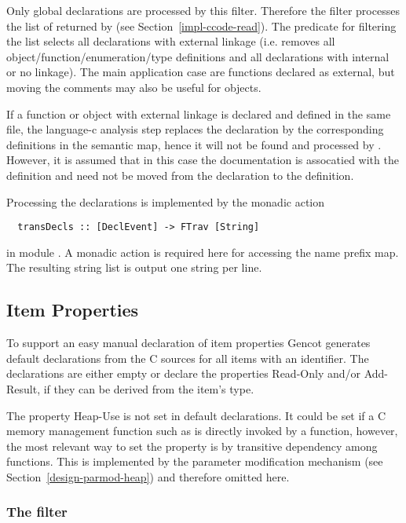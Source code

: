 Only global declarations are processed by this filter. Therefore the filter processes the list of 
returned by  (see Section~\ref{impl-ccode-read}). The predicate for filtering the list
selects all declarations with external linkage (i.e. removes all object/function/enumeration/type definitions and 
all declarations with internal or no linkage). 
The main application case are functions declared as external, but moving the comments may also be useful for 
objects.

If a function or object with external linkage is declared and defined in the same file, the language-c analysis step
replaces the declaration by the corresponding definitions in the semantic map, hence it will not be found and processed
by . However, it is assumed that in this case the documentation is assocatied with the definition
and need not be moved from the declaration to the definition.

Processing the declarations is implemented by the monadic action
\begin{verbatim}
  transDecls :: [DeclEvent] -> FTrav [String]
\end{verbatim}
in module . A monadic action is required here for accessing the name prefix map.
The resulting string list is output one string per line.

\subsection{Item Properties}
\label{impl-ccomps-itemprops}

To support an easy manual declaration of item properties Gencot generates default declarations from the C sources for all 
items with an identifier. The declarations are either empty or declare the properties Read-Only and/or Add-Result, if they
can be derived from the item's type. 

The property Heap-Use is not set in default declarations. It could be set if a C memory management function such as  
is directly invoked by a function, however, the most relevant way to set the property is by transitive dependency among functions.
This is implemented by the parameter modification mechanism (see Section~\ref{design-parmod-heap}) and therefore omitted here.

\subsubsection{The filter }

